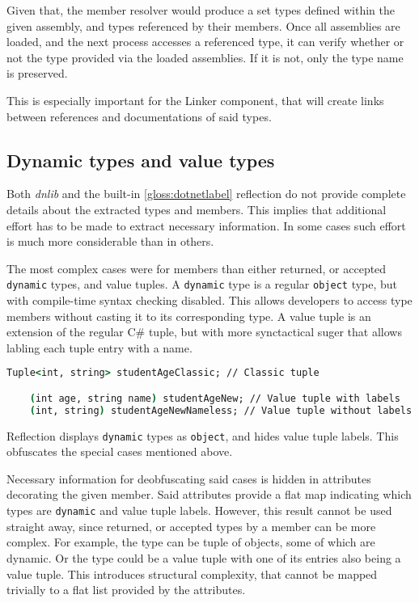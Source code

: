 Given that, the member resolver would produce a set types defined within the given assembly, and types referenced by their members. Once all assemblies are loaded, and the next process accesses a referenced type, it can verify whether or not the type provided via the loaded assemblies. If it is not, only the type name is preserved.

This is especially important for the Linker component, that will create links between references and documentations of said types.

\subsection{Dynamic types and value types}

Both \textit{dnlib} and the built-in \ref{gloss:dotnetlabel} reflection do not provide complete details about the extracted types and members. This implies that additional effort has to be made to extract necessary information. In some cases such effort is much more considerable than in others.

The most complex cases were for members than either returned, or accepted \lstinline[language=csh]{dynamic} types, and value tuples. A \lstinline[language=csh]{dynamic} type is a regular \lstinline[language=csh]{object} type, but with compile-time syntax checking disabled. This allows developers to access type members without casting it to its corresponding type. A value tuple is an extension of the regular C\# tuple, but with more synctactical suger that allows labling each tuple entry with a name.

\begin{lstlisting}[language=csh]
    Tuple<int, string> studentAgeClassic; // Classic tuple

    (int age, string name) studentAgeNew; // Value tuple with labels
    (int, string) studentAgeNewNameless; // Value tuple without labels
\end{lstlisting}

Reflection displays \lstinline[language=csh]{dynamic} types as \lstinline[language=csh]{object}, and hides value tuple labels. This obfuscates the special cases mentioned above.

Necessary information for deobfuscating said cases is hidden in attributes decorating the given member. Said attributes provide a flat map indicating which types are \lstinline[language=csh]{dynamic} and value tuple labels. However, this result cannot be used straight away, since returned, or accepted types by a member can be more complex. For example, the type can be tuple of objects, some of which are dynamic. Or the type could be a value tuple with one of its entries also being a value tuple. This introduces structural complexity, that cannot be mapped trivially to a flat list provided by the attributes.

